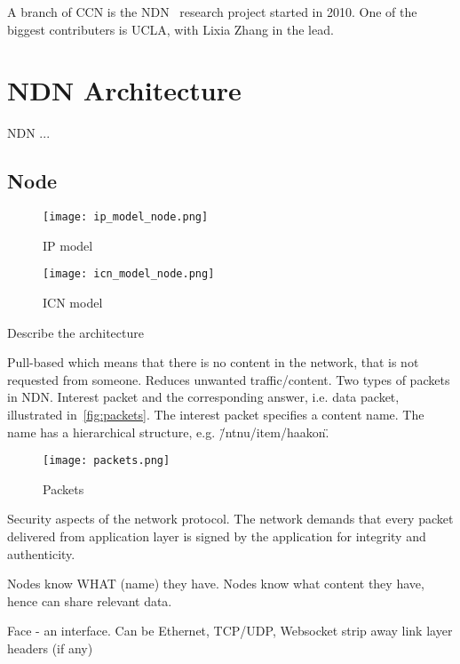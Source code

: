 A branch of \gls{CCN} is the \gls{NDN}~\cite{DBLP:journals/ccr/0001ABJcCPWZ14} research project started in 2010.
One of the biggest contributers is \gls{UCLA}, with Lixia Zhang in the lead.

\section{NDN Architecture}\label{chp2:sec:ndn_architecture}
\gls{NDN} ...


\subsection{Node}
\begin{figure}[ht]
  \centering
  \texttt{[image: ip\_model\_node.png]}
  \caption{\gls{IP} model}
  \label{fig:ip-model-node}
\end{figure}

\begin{figure}[ht]
  \centering
  \texttt{[image: icn\_model\_node.png]}
  \caption{\gls{ICN} model }
  \label{fig:icn-model-node}
\end{figure}

Describe the architecture ~\cite{NDN-0021}

Pull-based which means that there is no content in the network, that is not requested from someone.
Reduces unwanted traffic/content. 
Two types of packets in \gls{NDN}. Interest packet and the corresponding answer, i.e. data packet, illustrated in~\autoref{fig:packets}.
The interest packet specifies a content name. The name has a hierarchical structure, e.g. \"/ntnu/item/haakon\".  
\begin{figure}[ht]
  \centering
  \texttt{[image: packets.png]}
  \caption{Packets}
  \label{fig:packets}
\end{figure}

Security aspects of the network protocol. 
The network demands that every packet delivered from application layer is signed by the application for integrity and authenticity.

Nodes know WHAT (name) they have. 
Nodes know what content they have, hence can share relevant data.

Face - an interface. Can be Ethernet, TCP/UDP, Websocket
strip away link layer headers (if any)

